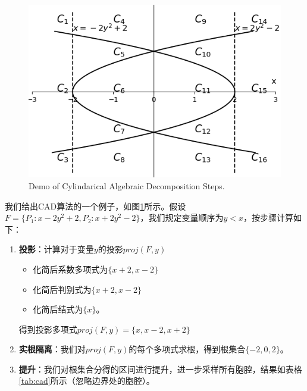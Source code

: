 \begin{example}
\begin{figure}[t]
    \centering
    \includegraphics[width=0.7\columnwidth]{Img/cad.png}
     {Demo of Cylindarical Algebraic Decomposition Steps.}
\label{fig:CAD}
\end{figure}

我们给出CAD算法的一个例子，如图\ref{fig:CAD}所示。假设$F = \{P_1: x - 2y^2 + 2, P_2: x + 2y^2 - 2\}$，我们规定变量顺序为$y < x$，按步骤计算如下：
\begin{enumerate}
    \item \textbf{投影}：计算对于变量$y$的投影$proj(F, y)$
    \begin{itemize}
        \item 化简后系数多项式为$\{x + 2, x - 2\}$
        \item 化简后判别式为$\{x + 2, x - 2\}$
        \item 化简后结式为$\{x\}$。
    \end{itemize}
    得到投影多项式$proj(F, y) = \{x, x - 2, x + 2\}$

    \item \textbf{实根隔离}：我们对$proj(F, y)$的每个多项式求根，得到根集合$\{-2, 0, 2\}$。
    \item \textbf{提升}：我们对根集合分得的区间进行提升，进一步采样所有胞腔，结果如表格\ref{tab:cad}所示（忽略边界处的胞腔）。
    \begin{table}[]
        \tiny
        \centering
\end{table}
\end{enumerate}
\end{example}
